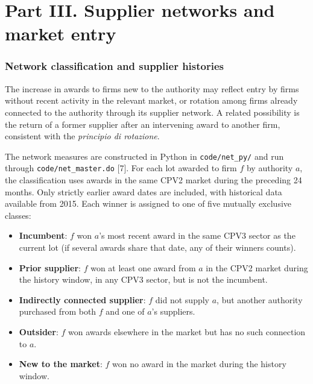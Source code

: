 \documentclass[11pt,a4paper]{article}
\newcommand{\code}[1]{\texttt{\small #1}}
\newcommand{\sect}[1]{\textsf{\small [#1]}}
\begin{document}
\part*{Part III. Supplier networks and market entry}

\section{Network classification and supplier histories}

The increase in awards to firms new to the authority may reflect entry by firms without recent activity in the relevant market, or rotation among firms already connected to the authority through its supplier network. A related possibility is the return of a former supplier after an intervening award to another firm, consistent with the \textit{principio di rotazione}.

The network measures are constructed in Python in \code{code/net\_py/} and run through \code{code/net\_master.do} \sect{7}. For each lot awarded to firm $f$ by authority $a$, the classification uses awards in the same CPV2 market during the preceding 24 months. Only strictly earlier award dates are included, with historical data available from 2015. Each winner is assigned to one of five mutually exclusive classes:
\begin{itemize}
\item \textbf{Incumbent}: $f$ won $a$'s most recent award in the same CPV3 sector as the current lot (if several awards share that date, any of their winners counts).
\item \textbf{Prior supplier}: $f$ won at least one award from $a$ in the CPV2 market during the history window, in any CPV3 sector, but is not the incumbent.
\item \textbf{Indirectly connected supplier}: $f$ did not supply $a$, but another authority purchased from both $f$ and one of $a$'s suppliers.
\item \textbf{Outsider}: $f$ won awards elsewhere in the market but has no such connection to $a$.
\item \textbf{New to the market}: $f$ won no award in the market during the history window.
\end{itemize}
\end{document}
